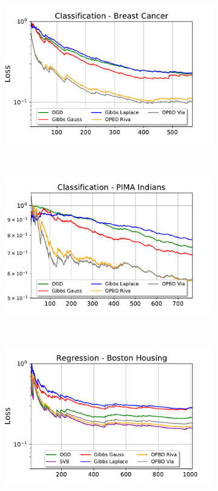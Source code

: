  \begin{figure}
   \centering
   \begin{subfigure}[b]{0.45\textwidth}
     \centering
     \includegraphics[width=\textwidth]{chapter_3/figures/class_breast.pdf}
  \end{subfigure}~
  \begin{subfigure}[b]{0.45\textwidth}
    \centering
    \includegraphics[width=\textwidth]{chapter_3/figures/class_diabetes}
 \end{subfigure}\\
 \begin{subfigure}[b]{0.45\textwidth}
   \centering
   \includegraphics[width=\textwidth]{chapter_3/figures/reg_boston}

\end{subfigure}
\end{figure}
